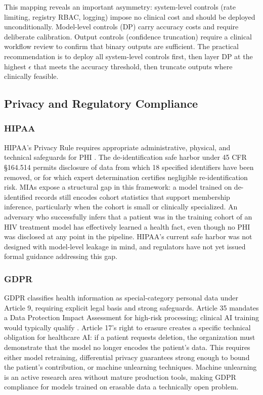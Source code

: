 \documentclass[conference]{IEEEtran}
\begin{document}
	This mapping reveals an important asymmetry: system-level controls (rate limiting, registry RBAC, logging) impose no clinical cost and should be deployed unconditionally. Model-level controls (DP) carry accuracy costs and require deliberate calibration. Output controls (confidence truncation) require a clinical workflow review to confirm that binary outputs are sufficient. The practical recommendation is to deploy all system-level controls first, then layer DP at the highest $\epsilon$ that meets the accuracy threshold, then truncate outputs where clinically feasible.

	\subsection{Privacy and Regulatory Compliance}

	\subsubsection{HIPAA}
	HIPAA's Privacy Rule requires appropriate administrative, physical, and technical safeguards for PHI \cite{hipaa}. The de-identification safe harbor under 45 CFR \S 164.514 permits disclosure of data from which 18 specified identifiers have been removed, or for which expert determination certifies negligible re-identification risk. MIAs expose a structural gap in this framework: a model trained on de-identified records still encodes cohort statistics that support membership inference, particularly when the cohort is small or clinically specialized. An adversary who successfully infers that a patient was in the training cohort of an HIV treatment model has effectively learned a health fact, even though no PHI was disclosed at any point in the pipeline. HIPAA's current safe harbor was not designed with model-level leakage in mind, and regulators have not yet issued formal guidance addressing this gap.

	\subsubsection{GDPR}
	GDPR classifies health information as special-category personal data under Article 9, requiring explicit legal basis and strong safeguards. Article 35 mandates a Data Protection Impact Assessment for high-risk processing; clinical AI training would typically qualify \cite{gdpr}. Article 17's right to erasure creates a specific technical obligation for healthcare AI: if a patient requests deletion, the organization must demonstrate that the model no longer encodes the patient's data. This requires either model retraining, differential privacy guarantees strong enough to bound the patient's contribution, or machine unlearning techniques. Machine unlearning is an active research area without mature production tools, making GDPR compliance for models trained on erasable data a technically open problem.
\end{document}
